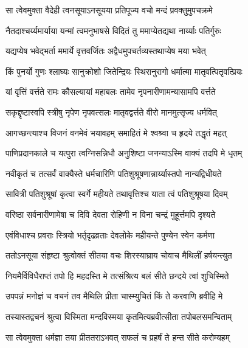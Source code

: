 
\twolineshloka
{सा त्वेवमुक्ता वैदेही त्वनसूयाऽनसूयया}
{प्रतिपूज्य वचो मन्दं प्रवक्तुमुपचक्रमे} %

\twolineshloka
{नैतदाश्चर्य्यमार्याया यन्मां त्वमनुभाषसे}
{विदितं तु ममाप्येतद्यथा नार्य्याः पतिर्गुरुः} %

\twolineshloka
{यद्यप्येष भवेद्भर्ता ममार्ये वृत्तवर्जितः}
{अद्वैधमुपचर्तव्यस्तथाप्येष मया भवेत्} %

\twolineshloka
{किं पुनर्यो गुणः श्लाघ्यः सानुक्रोशो जितेन्द्रियः}
{स्थिरानुरागो धर्मात्मा मातृवत्पितृवत्प्रियः} %

\twolineshloka
{यां वृत्तिं वर्त्तते रामः कौसल्यायां महाबलः}
{तामेव नृपनारीणामन्यासामपि वर्त्तते} %

\twolineshloka
{सकृद्दृष्टास्वपि स्त्रीषु नृपेण नृपवत्सलः}
{मातृवद्वर्त्तते वीरो मानमुत्सृज्य धर्मवित्} %

\twolineshloka
{आगच्छन्त्याश्च विजनं वनमेवं भयावहम्}
{समाहितं मे श्वश्र्वा च हृदये तद्धृतं महत्} %

\twolineshloka
{पाणिप्रदानकाले च यत्पुरा त्वग्निसन्निधौ}
{अनुशिष्टा जनन्याऽस्मि वाक्यं तदपि मे धृतम्} %

\twolineshloka
{नवीकृतं च तत्सर्वं वाक्यैस्ते धर्मचारिणि}
{पतिशुश्रूषणान्नार्य्यास्तपो नान्यद्विधीयते} %

\twolineshloka
{सावित्री पतिशुश्रूषां कृत्वा स्वर्गे महीयते}
{तथावृत्तिश्च याता त्वं पतिशुश्रूषया दिवम्} %

\twolineshloka
{वरिष्ठा सर्वनारीणामेषा च दिवि देवता}
{रोहिणी न विना चन्द्रं मुहूर्त्तमपि दृश्यते} %

\twolineshloka
{एवंविधाश्च प्रवराः स्त्रियो भर्तृदृढव्रताः}
{देवलोके महीयन्ते पुण्येन स्वेन कर्मणा} %

\twolineshloka
{ततोऽनसूया संहृष्टा श्रुत्वोक्तं सीतया वचः}
{शिरस्याघ्राय चोवाच मैथिलीं हर्षयन्त्युत} %

\twolineshloka
{नियमैर्विविधैराप्तं तपो हि महदस्ति मे}
{तत्संश्रित्य बलं सीते छन्दये त्वां शुचिस्मिते} %

\twolineshloka
{उपपन्नं मनोज्ञं च वचनं तव मैथिलि}
{प्रीता चास्म्युचितं किं ते करवाणि ब्रवीहि मे} %

\onelineshloka
{तस्यास्तद्वचनं श्रुत्वा विस्मिता मन्दविस्मया कृतमित्यब्रवीत्सीता तपोबलसमन्विताम्} %

\twolineshloka
{सा त्वेवमुक्ता धर्मज्ञा तया प्रीततराऽभवत्}
{सफलं च प्रहर्षं ते हन्त सीते करोम्यहम्} %

